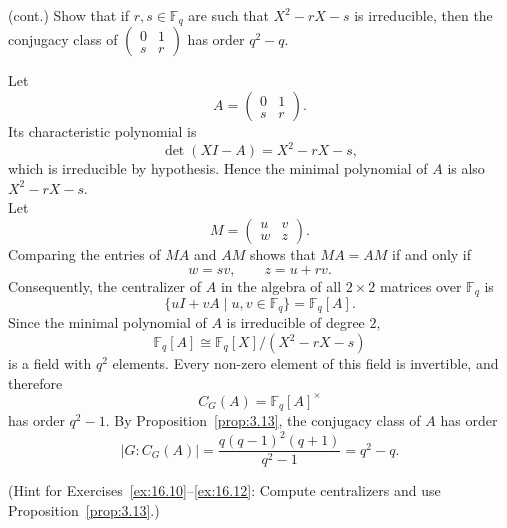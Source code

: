 \documentclass[../Odyssey_Project.tex]{subfiles}
\begin{document}
\begin{exercise}
\label{ex:16.12}
(cont.) Show that if $r, s \in \mathbb{F}_q$ are such that $X^2 - rX - s$ is irreducible, then the conjugacy class of $\begin{pmatrix} 0 & 1 \\ s & r \end{pmatrix}$ has order $q^2 - q$.
\end{exercise}
\begin{solution}
    Let
    \[
        A=
        \begin{pmatrix}
            0&1\\
            s&r
        \end{pmatrix}.
    \]
    Its characteristic polynomial is
    \[
        \det(XI-A)=X^2-rX-s,
    \]
    which is irreducible by hypothesis. Hence the minimal polynomial of $A$ is also $X^2-rX-s$.\\
    Let
    \[
        M=
        \begin{pmatrix}
            u&v\\
            w&z
        \end{pmatrix}.
    \]
    Comparing the entries of $MA$ and $AM$ shows that $MA=AM$ if and only if
    \[
        w=sv,
        \qquad
        z=u+rv.
    \]
    Consequently, the centralizer of $A$ in the algebra of all $2\times2$ matrices over $\mathbb{F}_q$ is
    \[
        \{uI+vA\mid u,v\in\mathbb{F}_q\}
        =
        \mathbb{F}_q[A].
    \]
    Since the minimal polynomial of $A$ is irreducible of degree $2$,
    \[
        \mathbb{F}_q[A]
        \cong
        \mathbb{F}_q[X]/(X^2-rX-s)
    \]
    is a field with $q^2$ elements. Every non-zero element of this field is invertible, and therefore
    \[
        C_G(A)=\mathbb{F}_q[A]^\times
    \]
    has order $q^2-1$. By Proposition~\ref{prop:3.13}, the conjugacy class of $A$ has order
    \[
        |G : C_G(A)|
        =
        \frac{q(q-1)^2(q+1)}{q^2-1}
        =
        q^2-q.
    \]
\end{solution}

\noindent (Hint for Exercises~\ref{ex:16.10}--\ref{ex:16.12}: Compute centralizers and use Proposition~\ref{prop:3.13}.)
\end{document}
